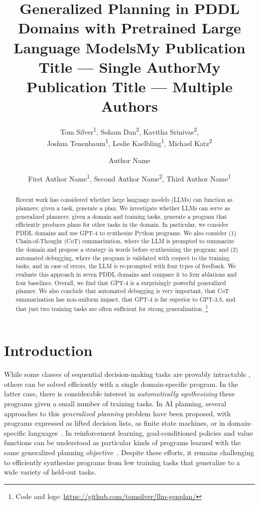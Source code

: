 \documentclass[letterpaper]{article} %
\title{Generalized Planning in PDDL Domains with Pretrained Large Language Models}
\author{
Tom Silver\textsuperscript{\rm 1},
Soham Dan\textsuperscript{\rm 2},
Kavitha Srinivas\textsuperscript{\rm 2},\\
Joshua Tenenbaum\textsuperscript{\rm 1},
Leslie Kaelbling\textsuperscript{\rm 1},
Michael Katz\textsuperscript{\rm 2}
}
\title{My Publication Title --- Single Author}
\author {
Author Name
}
\title{My Publication Title --- Multiple Authors}
\author {
First Author Name\textsuperscript{\rm 1},
Second Author Name\textsuperscript{\rm 2},
Third Author Name\textsuperscript{\rm 1}
}
\begin{document}
\maketitle

\begin{abstract}
Recent work has considered whether large language models (LLMs) can function as planners: given a task, generate a plan.
We investigate whether LLMs can serve as generalized planners: given a domain and training tasks, generate a program that efficiently produces plans for other tasks in the domain.
In particular, we consider PDDL domains and use GPT-4 to synthesize Python programs.
We also consider (1) Chain-of-Thought (CoT) summarization, where the LLM is prompted to summarize the domain and propose a strategy in words before synthesizing the program; and (2) automated debugging, where the program is validated with respect to the training tasks, and in case of errors, the LLM is re-prompted with four types of feedback.
We evaluate this approach in seven PDDL domains and compare it to four ablations and four baselines.
Overall, we find that GPT-4 is a surprisingly powerful generalized planner.
We also conclude that automated debugging is very important, that CoT summarization has non-uniform impact, that GPT-4 is far superior to GPT-3.5, and that just two training tasks are often sufficient for strong generalization.
\footnote{Code and logs: \url{https://github.com/tomsilver/llm-genplan/}}
\end{abstract}

\section{Introduction}


While some classes of sequential decision-making tasks are provably intractable \cite{chapman-aij1987}, others can be solved efficiently with a single domain-specific program.
In the latter case, there is considerable interest in \emph{automatically synthesizing} these programs given a small number of training tasks.
In AI planning, several approaches to this \emph{generalized planning} problem have been proposed, with programs expressed as lifted decision lists, as finite state machines, or in domain-specific languages~\cite{srivastava2011foundations,bonet2015policies,jimenez2019review,rivlin2020generalized}.
In reinforcement learning, goal-conditioned policies and value functions can be understood as particular kinds of programs learned with the same generalized planning objective~\cite{gcrl1,gcrl2}.
Despite these efforts, it remains challenging to efficiently synthesize programs from few training tasks that generalize to a wide variety of held-out tasks.
\end{document}
